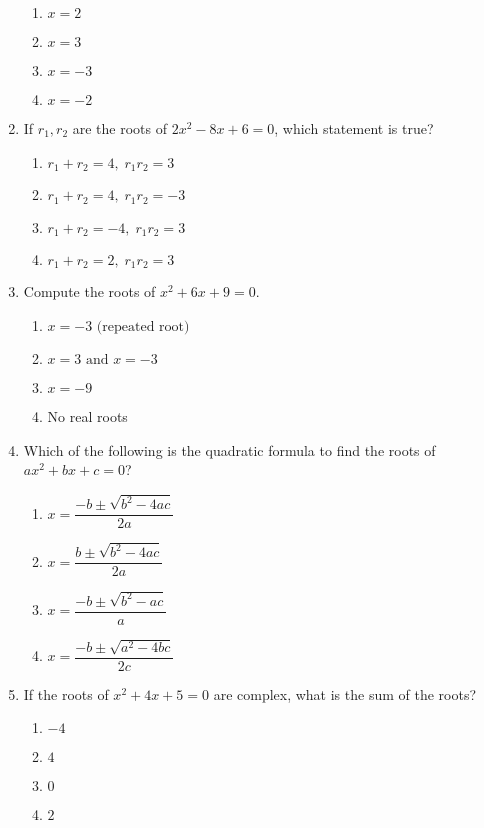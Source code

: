 \documentclass[12pt]{article}
\begin{document}
\begin{enumerate}
\begin{enumerate}
  \item \(x = 2\)
  \item \(x = 3\)
  \item \(x = -3\)
  \item \(x = -2\)
\end{enumerate}

\item If \(r_1, r_2\) are the roots of \(2x^2 - 8x + 6 = 0\), which statement is true?

\begin{enumerate}
  \item \(r_1 + r_2 = 4,\; r_1 r_2 = 3\)
  \item \(r_1 + r_2 = 4,\; r_1 r_2 = -3\)
  \item \(r_1 + r_2 = -4,\; r_1 r_2 = 3\)
  \item \(r_1 + r_2 = 2,\; r_1 r_2 = 3\)
\end{enumerate}

\item Compute the roots of \(x^2 + 6x + 9 = 0\).

\begin{enumerate}
  \item \(x = -3\text{ (repeated root)}\)
  \item \(x = 3\text{ and }x = -3\)
  \item \(x = -9\)
  \item No real roots
\end{enumerate}

\item Which of the following is the quadratic formula to find the roots of \(ax^2 + bx + c = 0\)?

\begin{enumerate}
  \item \(x = \dfrac{-b \pm \sqrt{b^2 - 4ac}}{2a}\)
  \item \(x = \dfrac{b \pm \sqrt{b^2 - 4ac}}{2a}\)
  \item \(x = \dfrac{-b \pm \sqrt{b^2 - ac}}{a}\)
  \item \(x = \dfrac{-b \pm \sqrt{a^2 - 4bc}}{2c}\)
\end{enumerate}

\item If the roots of \(x^2 + 4x + 5 = 0\) are complex, what is the sum of the roots?

\begin{enumerate}
  \item \(-4\)
  \item \(4\)
  \item \(0\)
  \item \(2\)
\end{enumerate}


\end{enumerate}
\end{document}
